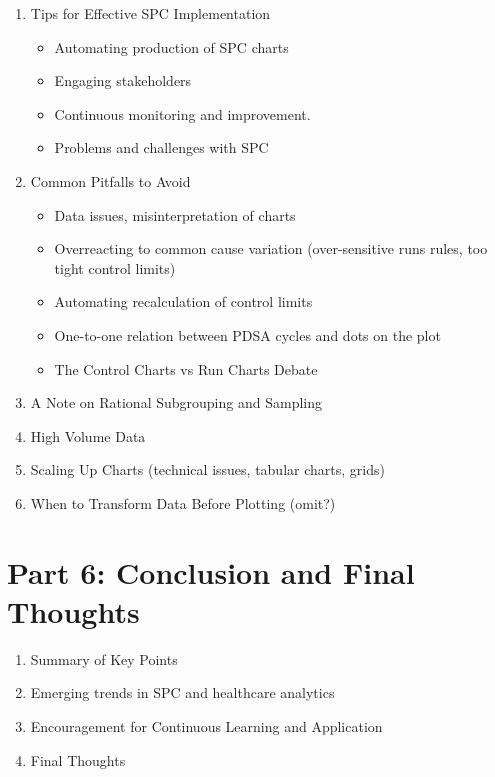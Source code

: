 \documentclass[
]{book}
\providecommand{\tightlist}{%
  \setlength{\itemsep}{0pt}\setlength{\parskip}{0pt}}
\begin{document}
\begin{enumerate}
\def\labelenumi{\arabic{enumi}.}
\tightlist
\item
  Tips for Effective SPC Implementation

  \begin{itemize}
  \tightlist
  \item
    Automating production of SPC charts
  \item
    Engaging stakeholders
  \item
    Continuous monitoring and improvement.
  \item
    Problems and challenges with SPC
  \end{itemize}
\item
  Common Pitfalls to Avoid

  \begin{itemize}
  \tightlist
  \item
    Data issues, misinterpretation of charts
  \item
    Overreacting to common cause variation (over-sensitive runs rules, too tight control limits)
  \item
    Automating recalculation of control limits
  \item
    One-to-one relation between PDSA cycles and dots on the plot
  \item
    The Control Charts vs Run Charts Debate
  \end{itemize}
\item
  A Note on Rational Subgrouping and Sampling
\item
  High Volume Data
\item
  Scaling Up Charts (technical issues, tabular charts, grids)
\item
  When to Transform Data Before Plotting (omit?)
\end{enumerate}

\section*{Part 6: Conclusion and Final Thoughts}\label{part-6-conclusion-and-final-thoughts}

\begin{enumerate}
\def\labelenumi{\arabic{enumi}.}
\tightlist
\item
  Summary of Key Points
\item
  Emerging trends in SPC and healthcare analytics
\item
  Encouragement for Continuous Learning and Application
\item
  Final Thoughts
\end{enumerate}
\end{document}
